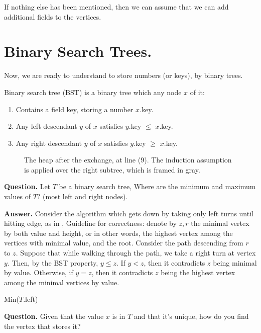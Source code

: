 If nothing else has been mentioned, then we can assume that we can add additional fields to the vertices.


\section{Binary Search Trees.}
Now, we are ready to understand to store numbers (or keys), by binary trees. 

\begin{framed}
  \begin{definition} Binary search tree (BST) is a binary tree which any node $x$ of it: 
    \begin{enumerate}
      \item Contains a field key, storing a number $x$.key. 
      \item Any left descendant $y$ of $x$ satisfies $y$.key $\le$ $x$.key. 
      \item Any right descendant $y$ of $x$ satisfies $y$.key $\ge$ $x$.key. 
    \end{enumerate}
  \end{definition}
\end{framed}



    \begin{figure}[h]
      \centering
      
      \caption{The heap after the exchange, at line (9). The induction assumption is applied over the right subtree, which is framed in gray.}
      \label{fig:<+label+>}
    \end{figure}

\textbf{Question.} Let $T$ be a binary search tree, Where are the minimum and maximum values of $T$? (most left and right nodes). 



\textbf{Answer.}  Consider the algorithm which gets down by taking only left turns until hitting edge, as in , Guideline for correctness: denote by $z, r$ the minimal vertex by both value and height, or in other words, the highest vertex among the vertices with minimal value, and the root. Consider the path descending from $r$ to $z$. Suppose that while walking through the path, we take a right turn at vertex $y$. Then, by the BST property, $y \le z$. If $y < z$, then it contradicts $z$ being minimal by value. Otherwise, if $y = z$, then it contradicts $z$ being the highest vertex among the minimal vertices by value.

\begin{algorithm}
\SetAlgoLined
{}
    \Return Min($T$.left)
\caption{Min} 
\label{alg:leftleft}
\end{algorithm}
\textbf{Question.}  Given that the value $x$ is in $T$ and that it's unique, how do you find the vertex that stores it?



